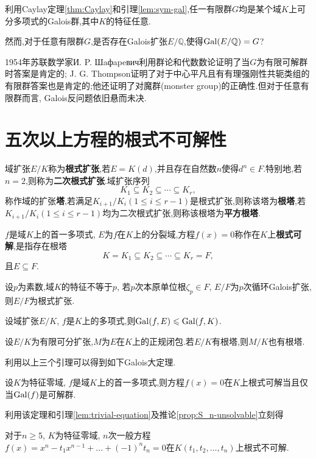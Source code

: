 \begin{corollary}
	利用Caylay定理\ref{thm:Caylay}和引理\ref{lem:sym-gal},任一有限群$G$均是某个域$K$上可分多项式的Galois群,其中$K$的特征任意.
\end{corollary}

然而,对于任意有限群$G$,是否存在Galois扩张$E/\mathbb{Q}$,使得$\operatorname{\mathrm{Gal}}(E/\mathbb{Q})=G$?

1954年苏联数学家И. P. Шaфapeвич利用群论和代数数论证明了当$G$为有限可解群时答案是肯定的; J. G. Thompson证明了对于中心平凡且有有理强刚性共轭类组的有限群答案也是肯定的;他还证明了对魔群(monster group)的正确性.但对于任意有限群而言, Galois反问题依旧悬而未决.
\section{五次以上方程的根式不可解性}
\begin{definition}
	域扩张$E/K$称为\textbf{根式扩张},若$E=K(d)$,并且存在自然数$n$使得$d^n\in F$.特别地,若$n=2$,则称为\textbf{二次根式扩张}.域扩张序列
	\[
	K_1\subseteq K_2\subseteq \cdots\subseteq K_r,
	\]
	称作域的扩张\textbf{塔},若满足$K_{i+1}/K_i(1\leqslant i\leqslant r-1)$是根式扩张,则称该塔为\textbf{根塔},若$K_{i+1}/K_i(1\leqslant i\leqslant r-1)$均为二次根式扩张,则称该根塔为\textbf{平方根塔}.
\end{definition}
\begin{definition}
	$f$是域$K$上的首一多项式, $E$为$f$在$K$上的分裂域,方程$f(x)=0$称作在$K$上\textbf{根式可解},是指存在根塔
	\[
	K=K_1\subseteq K_2\subseteq \cdots\subseteq K_r=F,
	\]
	且$E\subseteq F$.
\end{definition}
\begin{lemma}
	设$p$为素数,域$K$的特征不等于$p$, 若$p$次本原单位根$\zeta_p\in F$, $E/F$为$p$次循环Galois扩张,则$E/F$为根式扩张.
\end{lemma}
\begin{lemma}
	设域扩张$E/K$, $f$是$K$上的多项式,则$\operatorname{\mathrm{Gal}}(f,E)\leqslant\operatorname{\mathrm{Gal}}(f,K)$.
\end{lemma}
\begin{lemma}
	设$E/K$为有限可分扩张,$M$为$E$在$K$上的正规闭包.若$E/K$有根塔,则$M/K$也有根塔.
\end{lemma}

利用以上三个引理可以得到如下Galois大定理.
\begin{theorem}[Galois大定理]
	设$K$为特征零域, $f$是域$K$上的首一多项式,则方程$f(x)=0$在$K$上根式可解当且仅当$\operatorname{\mathrm{Gal}}(f)$是可解群.
\end{theorem}

利用该定理和引理\ref{lem:trivial-equation}及推论\ref{prop:S_n-unsolvable}立刻得
\begin{theorem}
	对于$n\geqslant5$, $K$为特征零域, $n$次一般方程$f(x)=x^n-t_1x^{n-1}+\dots+\left(-1\right)^nt_n=0$在$K(t_1,t_2,\dots,t_n)$上根式不可解.
\end{theorem}
